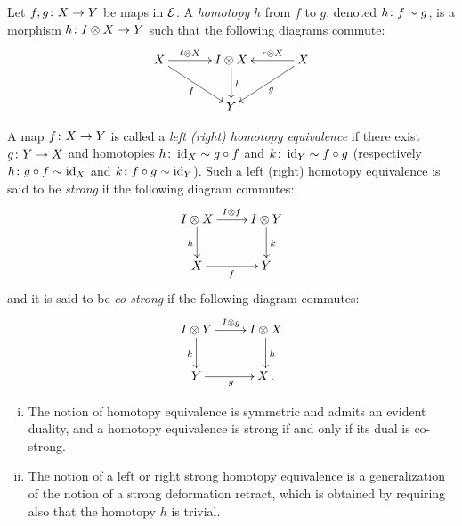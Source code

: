 \documentclass[reqno,10pt,a4paper,oneside]{amsart}
\begin{document}
\begin{definition}
\label{def:homotopy}
Let $f, g \colon X \to Y$ be maps in $\mathcal{E}$. A \emph{homotopy} $h$ from $f$ to $g$, denoted $h \colon f \sim g$, is a morphism $h \colon I \otimes X \to Y$ such that the following diagrams commute:
\[
\xymatrix@C=1.2cm{
X \ar[r]^-{\intervall \otimes X} \ar[dr]_{f} & \interval \otimes X \ar[d]^{h} & X \ar[dl]^{g} \ar[l]_-{\intervalr \otimes X}  \\
 & Y & }
 \]
\end{definition}




\begin{definition}
\label{def:homotopy-equivalence}
A map $f \colon X \to Y$ is called a \emph{left (right) homotopy equivalence} if there exist $g \colon Y \to X$ and homotopies $h \colon \operatorname{id}_X \sim g \mathbin{\circ} f$ and $k \colon
\operatorname{id}_Y \sim f \mathbin{\circ} g$ (respectively $h \colon g \mathbin{\circ} f \sim \operatorname{id}_X$ and $k \colon f \mathbin{\circ} g \sim \operatorname{id}_Y$). Such a left (right) homotopy equivalence is said to be \emph{strong} if the
following diagram commutes:
\[
\xymatrix{
\interval \otimes X \ar[r]^{\interval \otimes f } \ar[d]_{h} & \interval \otimes Y \ar[d]^{k} \\
X \ar[r]_{f} & Y}
\]
and it is said to be \emph{co-strong} if  the following diagram commutes:
\[
\xymatrix{
\interval \otimes Y \ar[r]^{\interval \otimes g } \ar[d]_{k} & \interval \otimes X \ar[d]^{h} \\
Y \ar[r]_{g} & X \, .}
\]
%
\end{definition}

\begin{remark} \hfill 
\begin{enumerate}[(i)]
\item  The notion of homotopy equivalence is symmetric and admits an evident duality, and a homotopy equivalence is strong if 
and only if its dual is co-strong. 
\item The notion of a left or right strong homotopy equivalence is a generalization of the notion of a strong deformation retract, which is obtained by requiring also
that the homotopy $h$ is trivial.
\end{enumerate}
\end{remark}
\end{document}
